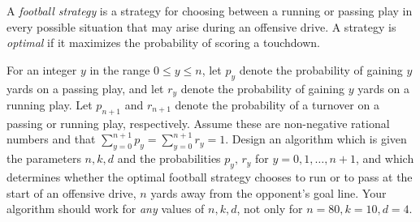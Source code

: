 \documentclass[12pt]{article}
\def\bigap{0.25in}
\begin{document}
A {\em football strategy} is a strategy
for choosing between a running or passing play
in every possible situation that may arise
during an offensive drive. A strategy is
{\em optimal} if it maximizes the probability
of scoring a touchdown.

For an integer $y$ in the range $0 \le y \le n$,
let $p_y$
denote the probability of gaining $y$ yards
on a passing play, and let $r_y$ denote the
probability of gaining $y$ yards on a running
play. Let $p_{n+1}$ and $r_{n+1}$ denote the
probability of a turnover on a passing or
running play, respectively.
Assume these are non-negative
rational numbers and that $\sum_{y=0}^{n+1} p_y
= \sum_{y=0}^{n+1} r_y = 1$.
Design an algorithm which is given the
parameters $n,k,d$ and the probabilities
$p_y, \, r_y$ for $y=0,1,\ldots,n+1$, and
which determines whether the optimal football strategy
chooses to run or to pass at the start of an
offensive drive, $n$ yards away from the
opponent's goal line. Your algorithm should work
for {\em any} values of $n,k,d$, not only for
$n=80, k=10, d=4$.


\vskip \bigap

\end{document}

